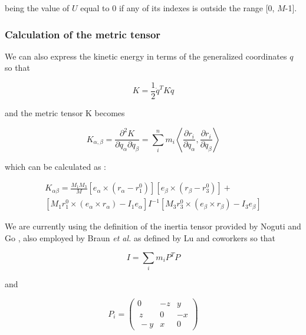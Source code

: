 being the value of $U$ equal to 0 if any of its indexes is outside the range [0, $M$-1].


\subsubsection{Calculation of the metric tensor} 

We can also express the kinetic energy in terms of the generalized coordinates $q$ so that 

\begin{equation}
K = \frac{1}{2} \dot{q}^T K \dot{q}
\end{equation}

and the metric tensor K becomes

\begin{equation}
K_{\alpha,\beta} = \frac{\partial^2 K}{ \partial \dot{q}_\alpha \partial \dot{q}_\beta} = \sum_i^n m_i \left< \frac{\partial r_i}{ \partial q_\alpha} , \frac{\partial r_i}{ \partial q_\beta} \right>
\end{equation}


which can be calculated as \cite{noguti_dynamics_1983}:

\begin{equation}
\begin{split}
K_{\alpha\beta} = \frac{M_1 M_3}{M} \left[ e_\alpha \times (r_\alpha - r^0_1) \right] \left[ e_\beta \times (r_\beta - r^0_3)\right ] + \\ \left[ M_1 r_1^0 \times (e_\alpha \times r_\alpha) - I_1 e_\alpha \right] I^{-1} \left [M_3 r_3^0 \times (e_\beta \times r_\beta) - I_3 e_\beta \right]
\end{split}
\end{equation}


We are currently using the definition of the inertia tensor provided by Noguti and Go \cite{noguti_dynamics_1983}, also employed by Braun \textit{et al.} \cite{braun_formulation_1984} as defined by Lu and coworkers \cite{lu_new_2006} so that

\begin{equation}
I = \sum_i m_i P^T P
\end{equation}

and 

\begin{equation}
P_i = \left( \begin{array}{ccc} 0 & -z & y \\\ z & 0 & -x \\\ -y & x & 0 \end{array} \right)
\end{equation}


